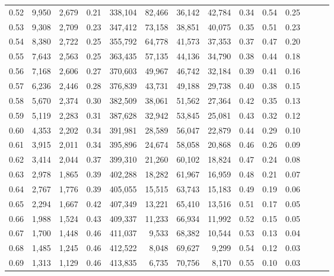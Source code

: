 \begin{tabular}{rrrrrrrrrrrrrr}
0.52 &   9,950 &  2,679 &  0.21 &  338,104 &   82,466 &  36,142 &  42,784 &  0.34 &  0.54 &      0.25 \\
0.53 &   9,308 &  2,709 &  0.23 &  347,412 &   73,158 &  38,851 &  40,075 &  0.35 &  0.51 &      0.23 \\
0.54 &   8,380 &  2,722 &  0.25 &  355,792 &   64,778 &  41,573 &  37,353 &  0.37 &  0.47 &      0.20 \\
0.55 &   7,643 &  2,563 &  0.25 &  363,435 &   57,135 &  44,136 &  34,790 &  0.38 &  0.44 &      0.18 \\
0.56 &   7,168 &  2,606 &  0.27 &  370,603 &   49,967 &  46,742 &  32,184 &  0.39 &  0.41 &      0.16 \\
0.57 &   6,236 &  2,446 &  0.28 &  376,839 &   43,731 &  49,188 &  29,738 &  0.40 &  0.38 &      0.15 \\
0.58 &   5,670 &  2,374 &  0.30 &  382,509 &   38,061 &  51,562 &  27,364 &  0.42 &  0.35 &      0.13 \\
0.59 &   5,119 &  2,283 &  0.31 &  387,628 &   32,942 &  53,845 &  25,081 &  0.43 &  0.32 &      0.12 \\
0.60 &   4,353 &  2,202 &  0.34 &  391,981 &   28,589 &  56,047 &  22,879 &  0.44 &  0.29 &      0.10 \\
0.61 &   3,915 &  2,011 &  0.34 &  395,896 &   24,674 &  58,058 &  20,868 &  0.46 &  0.26 &      0.09 \\
0.62 &   3,414 &  2,044 &  0.37 &  399,310 &   21,260 &  60,102 &  18,824 &  0.47 &  0.24 &      0.08 \\
0.63 &   2,978 &  1,865 &  0.39 &  402,288 &   18,282 &  61,967 &  16,959 &  0.48 &  0.21 &      0.07 \\
0.64 &   2,767 &  1,776 &  0.39 &  405,055 &   15,515 &  63,743 &  15,183 &  0.49 &  0.19 &      0.06 \\
0.65 &   2,294 &  1,667 &  0.42 &  407,349 &   13,221 &  65,410 &  13,516 &  0.51 &  0.17 &      0.05 \\
0.66 &   1,988 &  1,524 &  0.43 &  409,337 &   11,233 &  66,934 &  11,992 &  0.52 &  0.15 &      0.05 \\
0.67 &   1,700 &  1,448 &  0.46 &  411,037 &    9,533 &  68,382 &  10,544 &  0.53 &  0.13 &      0.04 \\
0.68 &   1,485 &  1,245 &  0.46 &  412,522 &    8,048 &  69,627 &   9,299 &  0.54 &  0.12 &      0.03 \\
0.69 &   1,313 &  1,129 &  0.46 &  413,835 &    6,735 &  70,756 &   8,170 &  0.55 &  0.10 &      0.03 \\

\end{tabular}
